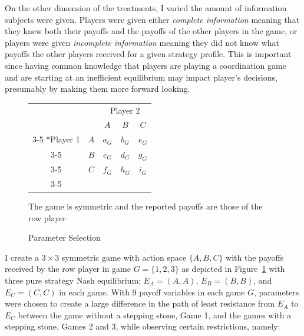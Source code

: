 On the other dimension of the treatments, I varied the amount of information subjects were given. Players were given either \textit{complete information} meaning that they knew both their payoffs and the payoffs of the other players in the game, or players were given \textit{incomplete information} meaning they did not know what payoffs the other players received for a given strategy profile. This is important since having common knowledge that players are playing a coordination game and are starting at an inefficient equilibrium may impact player’s decisions, presumably by making them more forward looking.

\begin{figure}[h]
\captionsetup{justification=centering}
  \caption[caption]{Parameter Selection}
   \label{fig:Parameters}
   \centering
\vskip6pt
\begin{tabular}{cc|c|c|c|}
      & \multicolumn{1}{c}{} & \multicolumn{3}{c}{Player 2}\\
      & \multicolumn{1}{c}{} & \multicolumn{1}{c}{$A$}  & \multicolumn{1}{c}{$B$} & \multicolumn{1}{c}{$C$} \\\cline{3-5}
      \multirow{2}*{Player 1}  & $A$ & $a_G$ & $b_G$ & $e_G$ \\\cline{3-5}
      & $B$ & $c_G$ & $d_G$ & $g_G$ \\\cline{3-5}
      & $C$ & $f_G$ & $h_G$ & $i_G$ \\\cline{3-5}
    \end{tabular}
        \vskip12pt\small
The game is symmetric and the reported payoffs are those of the row player
\end{figure}

I create a $3 \times 3$ symmetric game with action space $\{A, B, C\}$ with the payoffs received by the row player in game $G = \{1, 2, 3\}$ as depicted in Figure~\ref{fig:Parameters} with three pure strategy Nash equilibrium: $E_A = (A, A)$, $E_B = (B, B)$, and $E_C = (C, C)$ in each game. With 9 payoff variables in each game $G$, parameters were chosen to create a large difference in the path of least resistance from $E_A$ to $E_C$ between the game without a stepping stone, Game 1, and the games with a stepping stone, Games 2 and 3, while observing certain restrictions, namely: 

